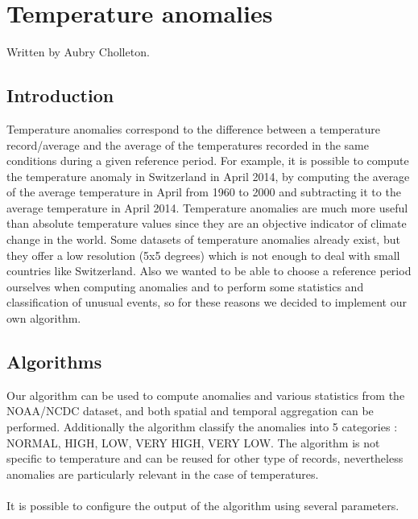 \section{Temperature anomalies}
Written by Aubry Cholleton.
\subsection{Introduction}

Temperature anomalies correspond to the difference between a temperature record/average
and the average of the temperatures recorded in the same conditions during a given reference period.
For example, it is possible to compute the temperature anomaly in Switzerland in April 2014, by
computing the average of the average temperature in April from 1960 to 2000 and subtracting it to the
average temperature in April 2014. Temperature anomalies are much more useful than absolute temperature values since
 they are an objective indicator of climate change in the world.
Some datasets of temperature anomalies already exist, but they offer a
low resolution (5x5 degrees) which is not enough to deal with small countries like Switzerland.
Also we wanted to be able to choose a reference period ourselves when computing anomalies and to perform some statistics and classification of unusual events, so for these reasons we decided to implement our own algorithm.

\subsection{Algorithms}

Our algorithm can be used to compute anomalies and various statistics from the NOAA/NCDC dataset, and both spatial and temporal aggregation
can be performed. Additionally the algorithm classify the anomalies into 5 categories : NORMAL, HIGH, LOW, VERY HIGH, VERY LOW.
The algorithm is not specific to temperature and can be reused for other type of records, nevertheless anomalies are particularly relevant in the case of temperatures.\\
\\It is possible to configure the output of the algorithm using several parameters.

